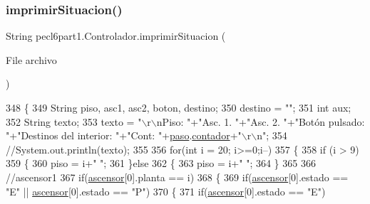 \subsubsection{\texorpdfstring{imprimir\+Situacion()}{imprimirSituacion()}}
{\footnotesize\ttfamily String pecl6part1.\+Controlador.\+imprimir\+Situacion (\begin{DoxyParamCaption}\item[{File}]{archivo }\end{DoxyParamCaption})\hspace{0.3cm}{\ttfamily [inline]}}


\begin{DoxyCode}
348     \{
349         String piso, asc1, asc2, boton, destino;
350         destino = \textcolor{stringliteral}{""};
351         \textcolor{keywordtype}{int} aux;
352         String texto;
353         texto = \textcolor{stringliteral}{"\(\backslash\)r\(\backslash\)nPiso:      "}+\textcolor{stringliteral}{"Asc. 1.      "}+\textcolor{stringliteral}{"Asc. 2.      "}+\textcolor{stringliteral}{"Botón pulsado:      "}+\textcolor{stringliteral}{"Destinos del
       interior:      "}+\textcolor{stringliteral}{"Cont: "}+\mbox{\hyperlink{classpecl6part1_1_1_controlador_af51f3a80f264d4175c0381f8b5e8edc0}{paso}}.\mbox{\hyperlink{classpecl6part1_1_1_monitor_aae725b0e0c2cef21ad644a73bc02b777}{contador}}+\textcolor{stringliteral}{"\(\backslash\)r\(\backslash\)n"};
354         \textcolor{comment}{//System.out.println(texto);}
355         
356         \textcolor{keywordflow}{for}(\textcolor{keywordtype}{int} i = 20; i>=0;i--)
357         \{
358             \textcolor{keywordflow}{if} (i > 9)
359             \{
360                 piso = i+\textcolor{stringliteral}{"         "};
361             \}\textcolor{keywordflow}{else}
362             \{
363                 piso = i+\textcolor{stringliteral}{"          "};
364             \}
365             
366             \textcolor{comment}{//ascensor1}
367             \textcolor{keywordflow}{if}(\mbox{\hyperlink{classpecl6part1_1_1_controlador_ab1a946290b47216d355b09da476486db}{ascensor}}[0].planta == i)
368             \{
369                 \textcolor{keywordflow}{if}(\mbox{\hyperlink{classpecl6part1_1_1_controlador_ab1a946290b47216d355b09da476486db}{ascensor}}[0].estado == \textcolor{stringliteral}{"E"} || \mbox{\hyperlink{classpecl6part1_1_1_controlador_ab1a946290b47216d355b09da476486db}{ascensor}}[0].estado == \textcolor{stringliteral}{"P"})
370                 \{
371                     \textcolor{keywordflow}{if}(\mbox{\hyperlink{classpecl6part1_1_1_controlador_ab1a946290b47216d355b09da476486db}{ascensor}}[0].estado == \textcolor{stringliteral}{"E"})

\end{DoxyCode}
